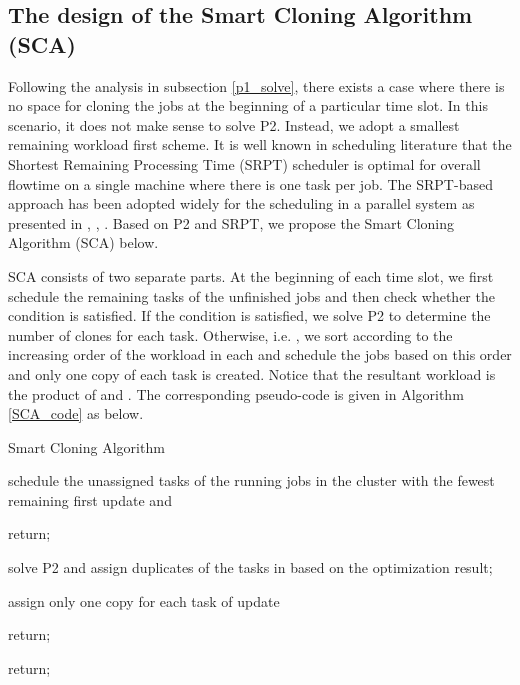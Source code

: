 \documentclass[10pt,conference]{IEEEtran}
\begin{document}
\subsection{The design of the Smart Cloning Algorithm (SCA)}
Following the analysis in subsection \ref{p1_solve}, there exists a case where there is no space for cloning the jobs at the beginning of a particular time slot. In this scenario, it does not make sense to solve P2. Instead,  we adopt a smallest remaining workload first scheme. It is well known in scheduling literature that the  Shortest Remaining Processing Time (SRPT) scheduler is optimal for overall flowtime on a single machine where there is one task per job. The SRPT-based approach has been adopted widely for the scheduling in a parallel system as presented in {\cite{Fast_Completion}}{\cite{Joint_Phase}}, {\cite{Flow_Shops}} {\cite{Delay_Tails}} {\cite{Data_Locality}} {\cite{Degree_Locality}}, {\cite{Schedulers}}. Based on P2 and SRPT, we propose the Smart Cloning Algorithm (SCA) below.

SCA consists of  two separate parts. At the beginning of each time slot, we first schedule the remaining tasks of the unfinished jobs and then check whether the condition  is satisfied. If the condition is satisfied, we solve  P2 to determine the number of clones for each task. Otherwise, i.e. ,  we sort  according to the increasing order of the workload in each  and schedule the jobs based on this order and only one copy of each task is created.
Notice that the resultant workload is the product of  and . The corresponding pseudo-code is given in Algorithm \ref{SCA_code} as below.


\IncMargin{1em}
\begin{algorithm}
\label{SCA_code}
\caption{Smart Cloning Algorithm}
\Indm
{}
\Indp
schedule the unassigned tasks of the running jobs in the cluster with the fewest remaining first\;
update  and \;

\If{ }
{
return;
}

\eIf{}
{
solve P2 and assign duplicates of the tasks in  based on the optimization result;
}
{
{
assign only one copy for each task of \;
update \;

\If{}
{
return;
}
}
}

return;
\end{algorithm}
\DecMargin{1em}
\vspace{-0.3em}
\end{document}

